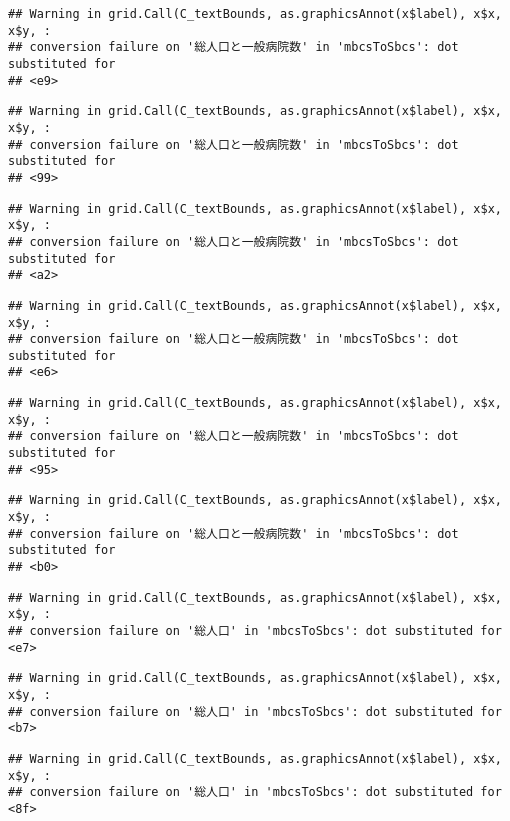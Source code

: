 \documentclass[
]{article}
\begin{document}
\begin{verbatim}
## Warning in grid.Call(C_textBounds, as.graphicsAnnot(x$label), x$x, x$y, :
## conversion failure on '総人口と一般病院数' in 'mbcsToSbcs': dot substituted for
## <e9>
\end{verbatim}

\begin{verbatim}
## Warning in grid.Call(C_textBounds, as.graphicsAnnot(x$label), x$x, x$y, :
## conversion failure on '総人口と一般病院数' in 'mbcsToSbcs': dot substituted for
## <99>
\end{verbatim}

\begin{verbatim}
## Warning in grid.Call(C_textBounds, as.graphicsAnnot(x$label), x$x, x$y, :
## conversion failure on '総人口と一般病院数' in 'mbcsToSbcs': dot substituted for
## <a2>
\end{verbatim}

\begin{verbatim}
## Warning in grid.Call(C_textBounds, as.graphicsAnnot(x$label), x$x, x$y, :
## conversion failure on '総人口と一般病院数' in 'mbcsToSbcs': dot substituted for
## <e6>
\end{verbatim}

\begin{verbatim}
## Warning in grid.Call(C_textBounds, as.graphicsAnnot(x$label), x$x, x$y, :
## conversion failure on '総人口と一般病院数' in 'mbcsToSbcs': dot substituted for
## <95>
\end{verbatim}

\begin{verbatim}
## Warning in grid.Call(C_textBounds, as.graphicsAnnot(x$label), x$x, x$y, :
## conversion failure on '総人口と一般病院数' in 'mbcsToSbcs': dot substituted for
## <b0>
\end{verbatim}

\begin{verbatim}
## Warning in grid.Call(C_textBounds, as.graphicsAnnot(x$label), x$x, x$y, :
## conversion failure on '総人口' in 'mbcsToSbcs': dot substituted for <e7>
\end{verbatim}

\begin{verbatim}
## Warning in grid.Call(C_textBounds, as.graphicsAnnot(x$label), x$x, x$y, :
## conversion failure on '総人口' in 'mbcsToSbcs': dot substituted for <b7>
\end{verbatim}

\begin{verbatim}
## Warning in grid.Call(C_textBounds, as.graphicsAnnot(x$label), x$x, x$y, :
## conversion failure on '総人口' in 'mbcsToSbcs': dot substituted for <8f>
\end{verbatim}
\end{document}
